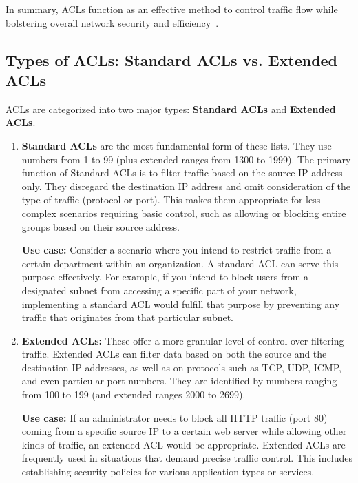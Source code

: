\documentclass[11pt,a4paper]{article}
\begin{document}
        In summary, ACLs function as an effective method to control traffic flow while bolstering overall network security and efficiency~\cite{Introduction}.

    

    \subsection*{Types of ACLs: Standard ACLs vs. Extended ACLs}
        ACLs are categorized into two major types: \textbf{Standard ACLs} and \textbf{Extended ACLs}.

        \begin{enumerate}
            \item \textbf{Standard ACLs} are the most fundamental form of these lists. They use numbers from 1 to 99 (plus extended ranges from 1300 to 1999). The primary function of Standard ACLs is to filter traffic based on the source IP address only. They disregard the destination IP address and omit consideration of the type of traffic (protocol or port). This makes them appropriate for less complex scenarios requiring basic control, such as allowing or blocking entire groups based on their source address.
        
            \textbf{Use case:} Consider a scenario where you intend to restrict traffic from a certain department within an organization. A standard ACL can serve this purpose effectively. For example, if you intend to block users from a designated subnet from accessing a specific part of your network, implementing a standard ACL would fulfill that purpose by preventing any traffic that originates from that particular subnet.

            \item  \textbf{Extended ACLs:} These offer a more granular level of control over filtering traffic. Extended ACLs can filter data based on both the source and the destination IP addresses, as well as on protocols such as TCP, UDP, ICMP, and even particular port numbers. They are identified by numbers ranging from 100 to 199 (and extended ranges 2000 to 2699).
    
            \textbf{Use case:} If an administrator needs to block all HTTP traffic (port 80) coming from a specific source IP to a certain web server while allowing other kinds of traffic, an extended ACL would be appropriate. Extended ACLs are frequently used in situations that demand precise traffic control. This includes establishing security policies for various application types or services.
      
        \end{enumerate}
\end{document}
